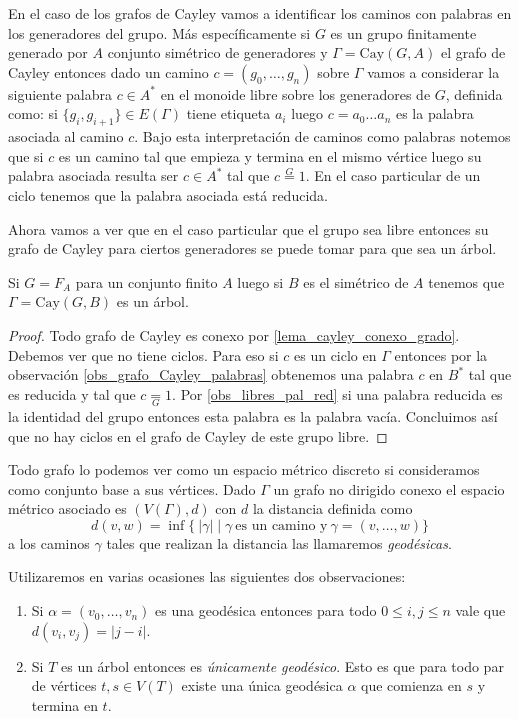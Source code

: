 \documentclass[tesis.tex]{subfiles}
\begin{document}
\begin{obs}\label{obs_grafo_Cayley_palabras}
	
En el caso de los grafos de Cayley vamos a identificar los caminos con palabras en los generadores del grupo.
Más específicamente si $G$ es un grupo finitamente generado por $A$ conjunto simétrico de generadores y $\Gamma = \text{Cay}(G,A)$ el grafo de Cayley entonces dado un camino $c = (g_{0}, \dots, g_{n})$ sobre $\Gamma$ vamos a considerar la siguiente palabra $c \in A^{*}$ en el monoide libre sobre los generadores de $G$, definida como:
si $\{g_{i},g_{i+1}\} \in E(\Gamma)$ tiene etiqueta $a_{i}$ luego $c = a_{0}\dots a_{n}$ es la palabra asociada al camino $c$.
Bajo esta interpretación de caminos como palabras notemos que si $c$ es un camino tal que empieza y termina en el mismo vértice luego su palabra asociada resulta ser $c \in A^*$ tal que $c \overset{G}{=} 1$.
En el caso particular de un ciclo tenemos que la palabra asociada está reducida.
\end{obs}

Ahora vamos a ver que en el caso particular que el grupo sea libre entonces su grafo de Cayley para ciertos generadores se puede tomar para que sea un árbol.

\begin{lema}\label{lema_cayley_libre_arbol}
	Si $G = F_{A}$ para un conjunto finito $A$ luego si $B$ es el simétrico de $A$ tenemos que $\Gamma = \text{Cay}(G,B)$ es un árbol.
\end{lema}

\begin{proof}
	Todo grafo de Cayley es conexo por \ref{lema_cayley_conexo_grado}.
	Debemos ver que no tiene ciclos.
	Para eso si $c$ es un ciclo en $\Gamma$ entonces por la observación \ref{obs_grafo_Cayley_palabras} obtenemos una palabra $c$ en $B^*$ tal que es {reducida} y tal que $c \underset{G}{=} 1$.
	Por \ref{obs_libres_pal_red} si una palabra reducida es la identidad del grupo entonces esta palabra es la palabra vacía.
	Concluimos así que no hay ciclos en el grafo de Cayley de este grupo libre.
	
\end{proof}


Todo grafo lo podemos ver como un espacio métrico discreto si consideramos como conjunto base a sus vértices. 
Dado $\Gamma$ un grafo no dirigido conexo el espacio métrico asociado es 
$ (V(\Gamma), d )$ con $d$ la distancia definida como 
\[
	d(v,w) = \inf \{ \  |\gamma|  \mid  \gamma \ \text{es un camino y} \ 
	\gamma=(v,\dots, w)  \}
\] 
a los caminos $\gamma$ tales que realizan la distancia las llamaremos \emph{geodésicas}.

Utilizaremos en varias ocasiones las siguientes dos observaciones:

\begin{enumerate}[1-]
	\item Si $\alpha = (v_{0}, \dots, v_{n})$ es una geodésica entonces para todo $0 \le i,j \le n$ vale que  $d(v_{i}, v_{j}) = |j-i|$.
	\item Si $T$ es un árbol entonces es \emph{únicamente geodésico}.
	Esto es que para todo par de vértices $t,s \in V(T)$ existe una única geodésica $\alpha$ que comienza en $s$ y termina en $t$.
\end{enumerate}
\end{document}
